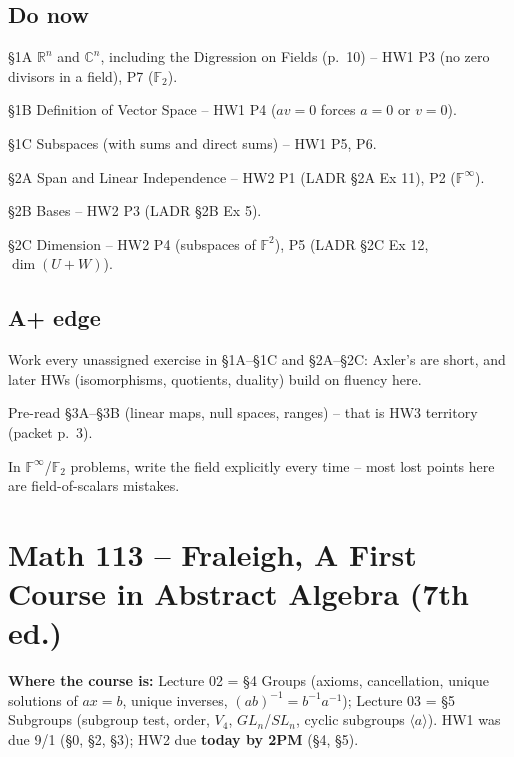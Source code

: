\documentclass[11pt]{article}
\begin{document}
\subsection*{Do now}
\begin{todo}
  \item \S1A $\mathbb{R}^n$ and $\mathbb{C}^n$, including the Digression on
    Fields (p.~10) -- HW1 P3 (no zero divisors in a field), P7
    ($\mathbb{F}_2$).
  \item \S1B Definition of Vector Space -- HW1 P4 ($av = 0$ forces $a = 0$ or
    $v = 0$).
  \item \S1C Subspaces (with sums and direct sums) -- HW1 P5, P6.
  \item \S2A Span and Linear Independence -- HW2 P1 (LADR \S2A Ex 11), P2
    ($\mathbb{F}^\infty$).
  \item \S2B Bases -- HW2 P3 (LADR \S2B Ex 5).
  \item \S2C Dimension -- HW2 P4 (subspaces of $\mathbb{F}^2$), P5 (LADR
    \S2C Ex 12, $\dim(U + W)$).
\end{todo}

\subsection*{A+ edge}
\begin{todo}
  \item Work every unassigned exercise in \S1A--\S1C and \S2A--\S2C: Axler's are
    short, and later HWs (isomorphisms, quotients, duality) build on fluency
    here.
  \item Pre-read \S3A--\S3B (linear maps, null spaces, ranges) -- that is HW3
    territory (packet p.~3).
  \item In $\mathbb{F}^\infty$/$\mathbb{F}_2$ problems, write the field
    explicitly every time -- most lost points here are field-of-scalars
    mistakes.
\end{todo}

\section*{Math 113 -- Fraleigh, A First Course in Abstract Algebra (7th ed.)}
\textbf{Where the course is:} Lecture 02 = \S4 Groups (axioms, cancellation, unique
solutions of $ax = b$, unique inverses, $(ab)^{-1} = b^{-1}a^{-1}$); Lecture 03 =
\S5 Subgroups (subgroup test, order, $V_4$, $GL_n$/$SL_n$, cyclic subgroups
$\langle a \rangle$). HW1 was due 9/1 (\S0, \S2, \S3); HW2 due \textbf{today by
2PM} (\S4, \S5).
\end{document}
